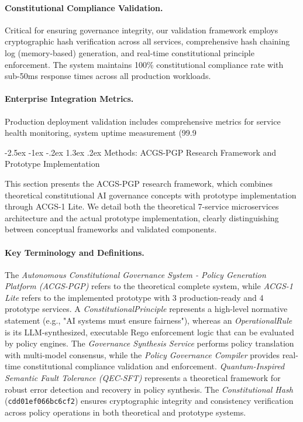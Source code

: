 \documentclass[manuscript,screen,9pt]{acmart}
\makeatletter
\renewcommand\section{\@startsection{section}{1}{\z@}%
  {-2.5ex \@plus -1ex \@minus -.2ex}%
  {1.3ex \@plus.2ex}%
  {\normalfont\Large\bfseries}}
\makeatother
\begin{document}
\paragraph{Constitutional Compliance Validation.} Critical for ensuring governance integrity, our validation framework employs cryptographic hash verification across all services, comprehensive hash chaining log (memory-based) generation, and real-time constitutional principle enforcement. The system maintains 100\% constitutional compliance rate with sub-50ms response times across all production workloads.

\paragraph{Enterprise Integration Metrics.} Production deployment validation includes comprehensive metrics for service health monitoring, system uptime measurement (99.9%

\section{Methods: ACGS-PGP Research Framework and Prototype Implementation}
\label{sec:methods}

This section presents the ACGS-PGP research framework, which combines theoretical constitutional AI governance concepts with prototype implementation through ACGS-1 Lite. We detail both the theoretical 7-service microservices architecture and the actual prototype implementation, clearly distinguishing between conceptual frameworks and validated components.

\paragraph{Key Terminology and Definitions.} The \textit{Autonomous Constitutional Governance System - Policy Generation Platform (ACGS-PGP)} refers to the theoretical complete system, while \textit{ACGS-1 Lite} refers to the implemented prototype with 3 production-ready and 4 prototype services. A \textit{ConstitutionalPrinciple} represents a high-level normative statement (e.g., "AI systems must ensure fairness"), whereas an \textit{OperationalRule} is its LLM-synthesized, executable Rego enforcement logic that can be evaluated by policy engines. The \textit{Governance Synthesis Service} performs policy translation with multi-model consensus, while the \textit{Policy Governance Compiler} provides real-time constitutional compliance validation and enforcement. \textit{Quantum-Inspired Semantic Fault Tolerance (QEC-SFT)} represents a theoretical framework for robust error detection and recovery in policy synthesis. The \textit{Constitutional Hash} (\texttt{cdd01ef066bc6cf2\cite{perf-report}\cite{perf-report}}) ensures cryptographic integrity and consistency verification across policy operations in both theoretical and prototype systems.
\end{document}
